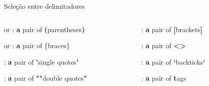\begin{frame}{Seleção entre delimitadores}
    \begin{columns}
        \begin{column}{0.6\textwidth}
            \begin{widedescription}
                \item {} or : \textbf{a} pair of \textbf{(}parentheses\textbf{)}
                \item {} or : \textbf{a} pair of \{braces\}
                \item {}: \textbf{a} pair of \textbf{'}single quotes\textbf{'}
                \item {}: \textbf{a} pair of \textbf{"}\textbf{"}double quotes\textbf{"}
            \end{widedescription}
        \end{column}
        
        \begin{column}{0.4\textwidth}
            \begin{widedescription}
                \item \key{a]}: \textbf{a} pair of \textbf{[}brackets\textbf{]}
                \item {}: \textbf{a} pair of \textbf{\textless\textgreater}
                \item {}: \textbf{a} pair of \textbf{`}backticks\textbf{`}
                \item {}: \textbf{a} pair of \textbf{t}ags
            \end{widedescription}
        \end{column}
    \end{columns}
\end{frame}

